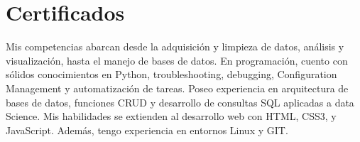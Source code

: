 \documentclass[a4paper,10pt]{article}
\begin{document}
	\section*{Certificados}
				\small      
			Mis competencias abarcan desde la adquisición y limpieza de datos, análisis y visualización, hasta el manejo de bases de datos.  En programación, cuento con sólidos conocimientos en Python, troubleshooting, debugging, Configuration Management y automatización de tareas. Poseo experiencia en arquitectura de bases de datos, funciones CRUD y desarrollo de consultas SQL aplicadas a data Science. Mis habilidades se extienden al desarrollo web con HTML, CSS3, y JavaScript. Además, tengo experiencia en entornos Linux y GIT. 
\end{document}

